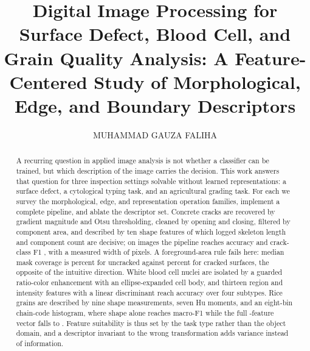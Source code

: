 \documentclass{ieeeaccess}
\begin{document}
\doi{}

\title{Digital Image Processing for Surface Defect, Blood Cell, and Grain
Quality Analysis: A Feature-Centered Study of Morphological, Edge, and
Boundary Descriptors}

\author{\uppercase{Muhammad Gauza Faliha}}
\address[1]{Department of Computer Science and Electronics, Faculty of
Mathematics and Natural Sciences, Universitas Gadjah Mada, Yogyakarta,
Indonesia (e-mail: muhammadgauzafaliha@mail.ugm.ac.id)}




\begin{abstract}
A recurring question in applied image analysis is not whether a classifier can be
trained, but which description of the image carries the decision. This work
answers that question for three inspection settings solvable without learned
representations: a surface defect, a cytological typing task, and an agricultural
grading task. For each we survey the morphological, edge, and representation
operation families, implement a complete pipeline, and ablate the descriptor set.
Concrete cracks are recovered by gradient magnitude and Otsu thresholding, cleaned
by opening and closing, filtered by component area, and described by ten shape
features of which logged skeleton length and component count are decisive; on
\crackImages{} images the pipeline reaches accuracy \crackAcc{} and crack-class F1
\crackFone{}, with a measured width of \crackWidth{} pixels. A foreground-area rule
fails here: median mask coverage is \crackCovNeg{} percent for uncracked against
\crackCovPos{} percent for cracked surfaces, the opposite of the intuitive
direction. White blood cell nuclei are isolated by a guarded ratio-color
enhancement with an ellipse-expanded cell body, and thirteen region and intensity
features with a linear discriminant reach accuracy \wbcAcc{} over four subtypes.
Rice grains are described by nine shape measurements, seven Hu moments, and an
eight-bin chain-code histogram, where shape alone reaches macro-F1 \riceMorphOne{}
while the full \riceFeatures-feature vector falls to \riceAllOne{}. Feature
suitability is thus set by the task type rather than the object domain, and a
descriptor invariant to the wrong transformation adds variance instead of
information.
\end{abstract}
\end{document}
